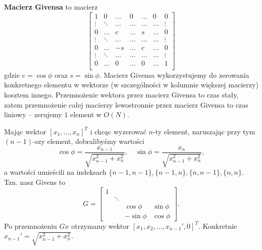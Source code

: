 \textbf{Macierz Givensa} to macierz
$$
\begin{bmatrix}
1 & 0 & \dots & 0 & \dots & 0 & 0 \\
\vdots & \ddots & \hdots & \dots& \dots&\dots & \vdots \\
0 & \dots & c & \dots & s & \dots & 0 \\
\vdots & \ddots & \hdots & \dots& \dots&\dots & \vdots \\
0 & \dots & -s & \dots & c & \dots & 0 \\
\vdots & \ddots & \hdots & \dots& \dots&\dots & \vdots \\
0 & \dots & 0 & \dots& 0 & \dots & 1\\
\end{bmatrix}
$$
gdzie $c=\cos\phi$ oraz $s=\sin\phi$. Macierz Givensa wykorzystujemy do zerowania konkretnego elementu w wektorze (w szczególności w kolumnie większej macierzy) kosztem innego. Przemnożenie wektora przez macierz Givensa to czas stały, zatem przemnożenie całej macierzy lewostronnie przez macierz Givensa to czas liniowy -- zerujemy $1$ element w $O(N)$.
\begin{example}
    Mając wektor $[x_1,\dots, x_n]^T$ i chcąc wyzerować $n$-ty element, naruszając przy tym $(n-1)$-szy element, dobralibyśmy wartości
    $$
    \cos\phi = \frac{x_{n-1}}{\sqrt{x_{n-1}^2 + x_n^2}}, \quad \sin\phi = \frac{x_n}{\sqrt{x_{n-1}^2 + x_n^2}},
    $$
    a wartości umieścili na indeksach $\{n-1,n-1\},\{n-1,n\},\{n,n-1\},\{n,n\}$. Tzn. nasz Givens to
    $$
    G = \begin{bmatrix}
        1 & & & \\
        & \ddots & & \\
        & & \cos\phi & \sin\phi \\
        & & -\sin\phi & \cos\phi
    \end{bmatrix}.
    $$
    Po przemnożeniu $Gx$ otrzymamy wektor $[x_1,x_2,\dots, x_{n-1}',0]^T$. Konkretnie $x_{n-1}'=\sqrt{x_{n-1}^2+x_n^2}$.
\end{example}

